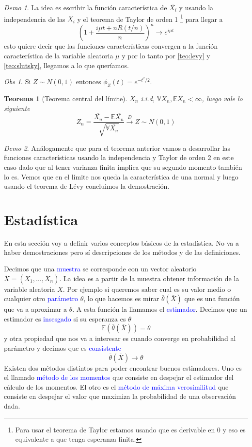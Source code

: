 \documentclass[11pt]{article}
\theoremstyle{plain} %
\newtheorem{teorema}{Teorema}
\theoremstyle{definition}
\theoremstyle{remark}
\newtheorem{obs}{Obs}
\newtheorem*{demo}{Demo}
\def\V{\mathbb{V}}
\def\E{\mathbb{E}}
\def\blue{\textcolor{blue}}
\renewcommand\qed{\ding{110}}
\newcommand{\X}{\overline{X}}
\newcommand{\dist}{\overset{D}{\to}}
\begin{document}
\begin{demo}
	La idea es escribir la función característica de $\overline{X_i}$ y usando la independencia de las $X_i$ y el teorema de Taylor de orden 1 \footnote{Para usar el teorema de Taylor estamos usando que es derivable en 0 y eso es equivalente a que tenga esperanza finita.} para llegar a 
	\[ \left( 1+ \dfrac{i\mu t + nR(t/n)}{n} \right) ^ {n} \to e^{i\mu t}  \]
	esto quiere decir que las funciones características convergen a la función característica de la variable aleatoria $\mu$ y por lo tanto por \ref{teo:levy} y \ref{teo:slutsky}, llegamos a lo que queríamos. \qed
\end{demo}

\begin{obs}
	Si $Z \sim N(0,1)$ entonces $\phi_{Z}(t) = e^{-t^{2}/{2}}$.
\end{obs}

\begin{teorema}		
	[Teorema central del límite]
	$X_n$ i.i.d, $\V X_n, \E X_n < \infty$, luego vale lo siguiente 
	\[ Z_n = \dfrac{\overline{X_n}-\E\overline{X_n}}{\sqrt{\V \overline{X_n} }} \dist Z \sim N(0,1) \]
	 
\end{teorema}

\begin{demo}
	Análogamente que para el teorema anterior vamos a desarrollar las funciones características usando la independencia y Taylor de orden 2 en este caso dado que al tener varianza finita implica que su segundo momento también lo es. Vemos que en el límite nos queda la característica de una normal y luego usando el teorema de Lévy concluimos la demostración.
\end{demo}


\bigskip
\section{Estadística}
En esta sección voy a definir varios conceptos básicos de la estadística. No va a haber demostraciones pero sí descripciones de los métodos y de las definiciones.

Decimos que una \blue{muestra} se corresponde con un vector aleatorio $\overline{X} = (X_1 , \dots , \X_n)$. La idea es a partir de la muestra obtener información de la variable aleatoria $X$. Por ejemplo si queremos saber cual es su valor medio o cualquier otro \blue{parámetro} $\theta$, lo que hacemos es mirar $\overline{\theta}(\overline{X})$ que es una función que va a aproximar a $\theta$. A esta función la llamamos el \blue{estimador}. Decimos que un estimador es \blue{insesgado} si su esperanza es  $\theta$
\[ \E \left( \overline{\theta}\left(\overline{X}\right) \right)  = \theta \]
y otra propiedad que nos va a interesar es cuando converge en probabilidad al parámetro y decimos que es \blue{consistente}
\[ \overline{\theta}\left(\overline{X}\right) \to \theta \]
Existen dos métodos distintos para poder encontrar buenos estimadores. Uno es el llamado \blue{método de los momentos} que consiste en despejar el estimador del cálculo de los momentos. El otro es el \blue{método de máxima verosimilitud} que consiste en despejar el valor que maximiza la probabilidad de una observación dada.
\end{document}
